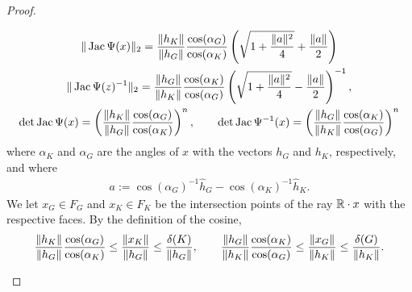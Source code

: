 \documentclass[10pt,a4paper]{article}
\begin{document}
\begin{proof}
\begin{itemize}
        \begin{gather*}
            \|  \operatorname{{\rm Jac}}\Psi(x)  \|_{2}
            = 
            \frac{ \| h_K \| }{ \| h_{{G}} \| }
            \frac{ \cos(\alpha_{{G}}) }{ \cos(\alpha_K) }
            \left( 
                \sqrt{ 1 + \frac{ \|a\|^{2} }{ 4 } } + \frac{ \|a\| }{2}
            \right)
            \\
            \|  \operatorname{{\rm Jac}}\Psi(z)^{-1}  \|_{2}
            = 
            \frac{ \| h_{{G}} \| }{ \| h_K \| }
            \frac{ \cos(\alpha_K) }{ \cos(\alpha_{{G}}) }
            \left( 
                \sqrt{ 1 + \frac{ \|a\|^{2} }{ 4 } } - \frac{ \|a\| }{2}
            \right)^{-1},
            \\
            \det\operatorname{{\rm Jac}}\Psi(x)
            =
            \left( 
            \frac{ \| h_K \| }{ \| h_{{G}} \| }
            \frac{ \cos(\alpha_{{G}}) }{ \cos(\alpha_K) }
            \right)^{n},
            \qquad
            \det\operatorname{{\rm Jac}}\Psi^{-1}(x)
            =
            \left( 
            \frac{ \| h_{{G}} \| }{ \| h_{K} \| }
            \frac{ \cos(\alpha_{K}) }{ \cos(\alpha_{{G}}) }
            \right)^{n}
        \end{gather*}
        where $\alpha_K$ and $\alpha_{{G}}$ are the angles of $x$ with the vectors $h_{{G}}$ and $h_{K}$, respectively,
        and where 
        \begin{align*}
            a := \cos(\alpha_{{G}})^{-1} \hat h_{{G}} - \cos(\alpha_K)^{-1} \hat h_K
            .
        \end{align*}
        We let $x_{G} \in F_{G}$ and $x_{K} \in F_{K}$ be the intersection points of the ray ${\mathbb R} \cdot x$ with the respective faces.
        By the definition of the cosine, 
        \begin{align*}
            \frac{ \| h_K \| }{ \| h_{{G}} \| }
            \frac{ \cos(\alpha_{{G}}) }{ \cos(\alpha_K) }
            \leq 
            \frac{ \| x_K \| }{ \| h_{{G}} \| }
            \leq 
            \frac{ {\delta}(K) }{ \| h_{{G}} \| }
            ,
            \qquad 
            \frac{ \| h_{{G}} \| }{ \| h_K \| }
            \frac{ \cos(\alpha_K) }{ \cos(\alpha_{{G}}) }
            \leq 
            \frac{ \| x_{G} \| }{ \| h_{K} \| }
            \leq 
            \frac{ {\delta}(G) }{ \| h_{K} \| }
            .
        \end{align*}


\end{itemize}
\end{proof}
\end{document}
